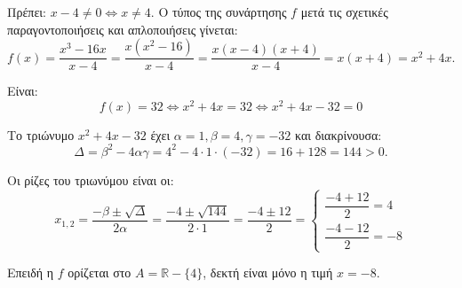 
\begin{alist}
\item Πρέπει: $x - 4 \ne 0 \Leftrightarrow x \ne 4$.
Ο τύπος της συνάρτησης $f$ μετά τις σχετικές παραγοντοποιήσεις και απλοποιήσεις γίνεται:
\[f(x) = \dfrac{x^3 - 16x}{x - 4} = \dfrac{x(x^2 - 16)}{x - 4} = \dfrac{x(x - 4)(x + 4)}{x - 4} = x(x + 4) = x^2 + 4x.\]

\item Είναι:
\[f(x) = 32 \Leftrightarrow x^2 + 4x = 32 \Leftrightarrow x^2 + 4x - 32 = 0\]

Το τριώνυμο $x^2 + 4x - 32$ έχει $\alpha = 1, \beta = 4, \gamma = -32$ και διακρίνουσα:
\[\Delta = \beta^2 - 4\alpha\gamma = 4^2 - 4 \cdot 1 \cdot (-32) = 16 + 128 = 144 > 0.\]

Οι ρίζες του τριωνύμου είναι οι:
\[x_{1,2} = \dfrac{-\beta \pm \sqrt{\Delta}}{2\alpha} = \dfrac{-4 \pm \sqrt{144}}{2 \cdot 1} = \dfrac{-4 \pm 12}{2} = \begin{cases} \dfrac{-4 + 12}{2} = 4 \\[2ex] \dfrac{-4 - 12}{2} = -8 \end{cases}\]

Επειδή η $f$ ορίζεται στο $A = \mathbb{R} - \{4\}$, δεκτή είναι μόνο η τιμή $x = -8$.
\end{alist}

